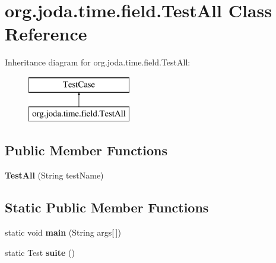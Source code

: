 \hypertarget{classorg_1_1joda_1_1time_1_1field_1_1_test_all}{\section{org.\-joda.\-time.\-field.\-Test\-All Class Reference}
\label{classorg_1_1joda_1_1time_1_1field_1_1_test_all}
}
Inheritance diagram for org.\-joda.\-time.\-field.\-Test\-All\-:\begin{figure}[H]
\begin{center}
\leavevmode
\includegraphics[height=2.000000cm]{classorg_1_1joda_1_1time_1_1field_1_1_test_all}
\end{center}
\end{figure}
\subsection*{Public Member Functions}
\begin{DoxyCompactItemize}
\item 
\hypertarget{classorg_1_1joda_1_1time_1_1field_1_1_test_all_a25079b444d241ae9806752084dd1130e}{{\bfseries Test\-All} (String test\-Name)}\label{classorg_1_1joda_1_1time_1_1field_1_1_test_all_a25079b444d241ae9806752084dd1130e}

\end{DoxyCompactItemize}
\subsection*{Static Public Member Functions}
\begin{DoxyCompactItemize}
\item 
\hypertarget{classorg_1_1joda_1_1time_1_1field_1_1_test_all_a07f2e5cd8e61a6cec3c4dc9154e55448}{static void {\bfseries main} (String args\mbox{[}$\,$\mbox{]})}\label{classorg_1_1joda_1_1time_1_1field_1_1_test_all_a07f2e5cd8e61a6cec3c4dc9154e55448}

\item 
\hypertarget{classorg_1_1joda_1_1time_1_1field_1_1_test_all_a24ae5f7ef7528ded22ce41e2352e9795}{static Test {\bfseries suite} ()}\label{classorg_1_1joda_1_1time_1_1field_1_1_test_all_a24ae5f7ef7528ded22ce41e2352e9795}

\end{DoxyCompactItemize}


